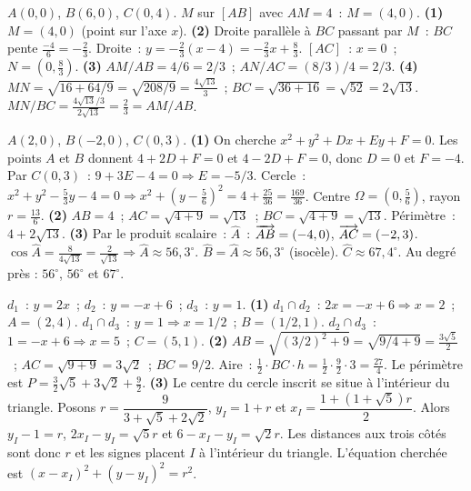 
$A(0,0)$, $B(6,0)$, $C(0,4)$. $M$ sur $[AB]$ avec $AM=4$~: $M=(4,0)$.
\textbf{(1)} $M=(4,0)$ (point sur l'axe $x$).
\textbf{(2)} Droite parall\`ele \`a $BC$ passant par $M$~: $BC$ pente $\frac{-4}{6}=-\frac{2}{3}$.
Droite~: $y=-\frac{2}{3}(x-4)=-\frac{2}{3}x+\frac{8}{3}$.
$[AC]$~: $x=0$~; $N=(0,\frac{8}{3})$.
\textbf{(3)} $AM/AB=4/6=2/3$~; $AN/AC=(8/3)/4=2/3$.\checkmark
\textbf{(4)} $MN=\sqrt{16+64/9}=\sqrt{208/9}=\frac{4\sqrt{13}}{3}$~; $BC=\sqrt{36+16}=\sqrt{52}=2\sqrt{13}$.
$MN/BC=\frac{4\sqrt{13}/3}{2\sqrt{13}}=\frac{2}{3}=AM/AB$.\checkmark


$A(2,0)$, $B(-2,0)$, $C(0,3)$.
\textbf{(1)} On cherche $x^2+y^2+Dx+Ey+F=0$.
Les points $A$ et $B$ donnent $4+2D+F=0$ et $4-2D+F=0$,
donc $D=0$ et $F=-4$.
Par $C(0,3)$~: $9+3E-4=0\Rightarrow E=-5/3$.
Cercle~: $x^2+y^2-\frac{5}{3}y-4=0\Rightarrow x^2+(y-\frac{5}{6})^2=4+\frac{25}{36}=\frac{169}{36}$.
Centre $\Omega=(0,\frac{5}{6})$, rayon $r=\frac{13}{6}$.
\textbf{(2)} $AB=4$~; $AC=\sqrt{4+9}=\sqrt{13}$~; $BC=\sqrt{4+9}=\sqrt{13}$. P\'erim\`etre~: $4+2\sqrt{13}$.
\textbf{(3)} Par le produit scalaire~: $\hat{A}$~: $\overrightarrow{AB}=(-4,0)$, $\overrightarrow{AC}=(-2,3)$.
$\cos\hat{A}=\frac{8}{4\sqrt{13}}=\frac{2}{\sqrt{13}}\Rightarrow\hat{A}\approx56{,}3^{\circ}$.
$\hat{B}=\hat{A}\approx56{,}3^{\circ}$ (isoc\`ele). $\hat{C}\approx67{,}4^{\circ}$.
Au degr\'e pr\`es : $56^{\circ}$, $56^{\circ}$ et $67^{\circ}$.


$d_1$~: $y=2x$~; $d_2$~: $y=-x+6$~; $d_3$~: $y=1$.
\textbf{(1)} $d_1\cap d_2$~: $2x=-x+6\Rightarrow x=2$~; $A=(2,4)$.
$d_1\cap d_3$~: $y=1\Rightarrow x=1/2$~; $B=(1/2,1)$.
$d_2\cap d_3$~: $1=-x+6\Rightarrow x=5$~; $C=(5,1)$.
\textbf{(2)} $AB=\sqrt{(3/2)^2+9}=\sqrt{9/4+9}=\frac{3\sqrt{5}}{2}$~;
$AC=\sqrt{9+9}=3\sqrt{2}$~; $BC=9/2$.
Aire~: $\frac{1}{2}\cdot BC\cdot h=\frac{1}{2}\cdot\frac{9}{2}\cdot3=\frac{27}{4}$.
Le p\'erim\`etre est $P=\frac32\sqrt5+3\sqrt2+\frac92$.
\textbf{(3)} Le centre du cercle inscrit se situe \`a l'int\'erieur du triangle.
Posons $r=\dfrac{9}{3+\sqrt5+2\sqrt2}$, $y_I=1+r$ et
$x_I=\dfrac{1+(1+\sqrt5)r}{2}$.
Alors $y_I-1=r$, $2x_I-y_I=\sqrt5r$ et $6-x_I-y_I=\sqrt2r$.
Les distances aux trois c\^ot\'es sont donc $r$ et les signes placent $I$
\`a l'int\'erieur du triangle. L'\'equation cherch\'ee est
$(x-x_I)^2+(y-y_I)^2=r^2$.

